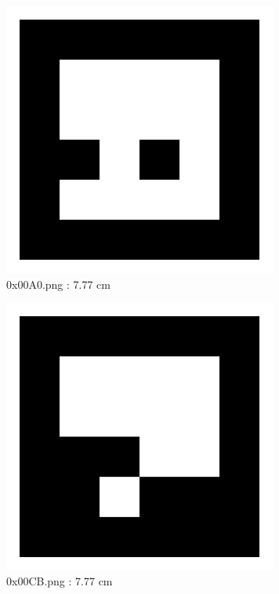 \documentclass[11pt,a4,BCOR=0cm]{scrartcl}
\begin{document}
\begin{figure}
  \centering
    \includegraphics[natwidth=400,natheight=400,width=9cm]{0x00A0.png}
    \caption{0x00A0.png : 7.77 cm}
    \label{fig:0x00A0.png}
  
\end{figure} 

\begin{figure}
  \centering
    \includegraphics[natwidth=400,natheight=400,width=9cm]{0x00CB.png}
    \caption{0x00CB.png : 7.77 cm}
    \label{fig:0x00CB.png}
  
\end{figure} 

\clearpage
\end{document}
